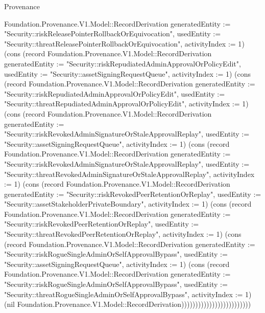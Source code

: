 \begin{lexlean}{Provenance}
\begin{semanticmodule}
{Foundation.Provenance.V1.Model::RecordDerivation {generatedEntity := "Security::riskReleasePointerRollbackOrEquivocation", usedEntity := "Security::threatReleasePointerRollbackOrEquivocation", activityIndex := 1}) (cons (record Foundation.Provenance.V1.Model::RecordDerivation {generatedEntity := "Security::riskRepudiatedAdminApprovalOrPolicyEdit", usedEntity := "Security::assetSigningRequestQueue", activityIndex := 1}) (cons (record Foundation.Provenance.V1.Model::RecordDerivation {generatedEntity := "Security::riskRepudiatedAdminApprovalOrPolicyEdit", usedEntity := "Security::threatRepudiatedAdminApprovalOrPolicyEdit", activityIndex := 1}) (cons (record Foundation.Provenance.V1.Model::RecordDerivation {generatedEntity := "Security::riskRevokedAdminSignatureOrStaleApprovalReplay", usedEntity := "Security::assetSigningRequestQueue", activityIndex := 1}) (cons (record Foundation.Provenance.V1.Model::RecordDerivation {generatedEntity := "Security::riskRevokedAdminSignatureOrStaleApprovalReplay", usedEntity := "Security::threatRevokedAdminSignatureOrStaleApprovalReplay", activityIndex := 1}) (cons (record Foundation.Provenance.V1.Model::RecordDerivation {generatedEntity := "Security::riskRevokedPeerRetentionOrReplay", usedEntity := "Security::assetStakeholderPrivateBoundary", activityIndex := 1}) (cons (record Foundation.Provenance.V1.Model::RecordDerivation {generatedEntity := "Security::riskRevokedPeerRetentionOrReplay", usedEntity := "Security::threatRevokedPeerRetentionOrReplay", activityIndex := 1}) (cons (record Foundation.Provenance.V1.Model::RecordDerivation {generatedEntity := "Security::riskRogueSingleAdminOrSelfApprovalBypass", usedEntity := "Security::assetSigningRequestQueue", activityIndex := 1}) (cons (record Foundation.Provenance.V1.Model::RecordDerivation {generatedEntity := "Security::riskRogueSingleAdminOrSelfApprovalBypass", usedEntity := "Security::threatRogueSingleAdminOrSelfApprovalBypass", activityIndex := 1}) (nil Foundation.Provenance.V1.Model::RecordDerivation)))))))))))))))))))))))))
}


\end{semanticmodule}
\end{lexlean}

